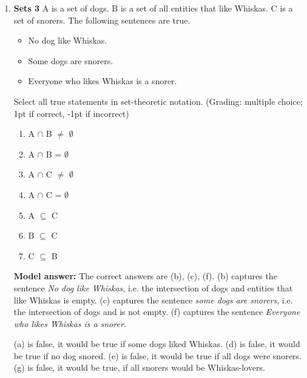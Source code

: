 \documentclass[a4,11pt]{article}
\begin{document}
\begin{enumerate}[leftmargin = 12pt]
        \begin{enumerate}[noitemsep]
        \item A $\cap$ B = $\emptyset$ (1pt checked / -1pt unchecked)
	\item A $\cup$ B = $\emptyset$  (-1pt checked / 1pt unchecked)
        \item A $\subset$ B (-1pt checked / 1pt unchecked)
	\end{enumerate}	

{\bf Model answer:}  The correct answer is  A $\subset$ B because every member of the set of parrots is a member of the set of entities who like to sing.

\item {\bf Sets 3}  A is a set of dogs. B is a set of all entities that like Whiskas. C is a set of snorers. The following sentences are true. 

\begin{itemize}[noitemsep]
\item No dog like Whiskas.
\item Some dogs are snorers.
\item Everyone who likes Whiskas is a snorer.
\end{itemize}

Select all true statements in set-theoretic notation. (Grading: multiple choice; 1pt if correct, -1pt if incorrect)

\begin{enumerate}
\item A $\cap$ B $\neq$ $\emptyset$
\item A $\cap$ B = $\emptyset$
\item A $\cap$ C $\neq$ $\emptyset$
\item A $\cap$ C = $\emptyset$
\item A $\subseteq$ C 
\item B $\subseteq$ C 
\item C $\subseteq$ B
\end{enumerate}

{\bf Model answer:} The correct answers are (b), (c), (f). (b) captures the sentence \textit{No dog like Whiskas}, i.e. the intersection of dogs and entities that like Whiskas is empty. (c) captures the sentence \textit{some dogs are snorers}, i.e. the intersection of dogs and is not empty. (f) captures the sentence \textit{Everyone who likes Whiskas is a snorer}.

(a) is false, it would be true if some dogs liked Whiskas. (d) is false, it would be true if no dog snored. (e) is false, it would be true if all dogs were snorers. (g) is false, it would be true, if all snorers would be Whiskas-lovers.



\end{enumerate}
\end{document}
